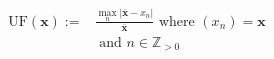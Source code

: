 \begin{equation}
\begin{split}	
	\text{UF}(\textbf{x}) :=& \frac{\max_n |\overline{\textbf{x}} - x_n|}{\overline{\textbf{x}}} \text{ where } (x_n) = \textbf{x} \\
	&\text{ and } n \in \mathbb{Z}_{>0}
\end{split}
\label{ch1:equ:unbalance-equation}
\end{equation}